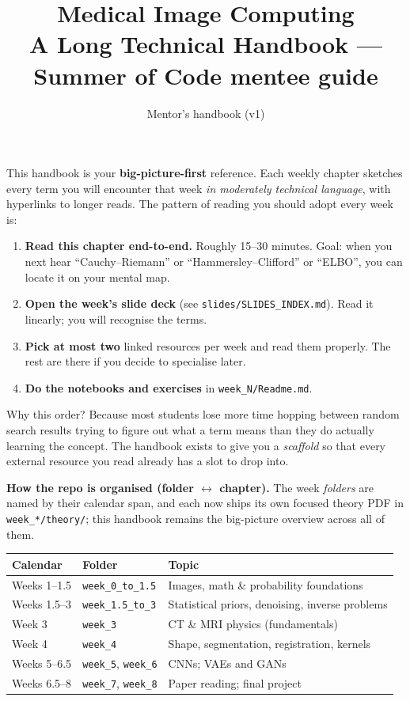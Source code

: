 \documentclass[11pt,a4paper]{article}
\title{\sffamily\bfseries Medical Image Computing\\[3pt]
       \large A Long Technical Handbook --- Summer of Code mentee guide}
\author{\sffamily Mentor's handbook (v1)}
\date{}
\begin{document}
\maketitle

\begin{howtoread}
This handbook is your \textbf{big-picture-first} reference. Each
weekly chapter sketches every term you will encounter that week
\emph{in moderately technical language}, with hyperlinks to longer
reads. The pattern of reading you should adopt every week is:

\begin{enumerate}[nosep, leftmargin=*]
  \item \textbf{Read this chapter end-to-end.} Roughly 15--30 minutes.
        Goal: when you next hear ``Cauchy--Riemann'' or ``Hammersley--Clifford''
        or ``ELBO'', you can locate it on your mental map.
  \item \textbf{Open the week's slide deck} (see
        \texttt{slides/SLIDES\_INDEX.md}). Read it linearly; you will
        recognise the terms.
  \item \textbf{Pick at most two} linked resources per week and read
        them properly. The rest are there if you decide to specialise
        later.
  \item \textbf{Do the notebooks and exercises} in
        \texttt{week\_N/Readme.md}.
\end{enumerate}

Why this order? Because most students lose more time hopping between
random search results trying to figure out what a term means than they
do actually learning the concept. The handbook exists to give you a
\emph{scaffold} so that every external resource you read already has a
slot to drop into.
\end{howtoread}

\bigskip
\noindent\textsf{\bfseries How the repo is organised (folder $\leftrightarrow$ chapter).}
The week \emph{folders} are named by their calendar span, and each now ships its
own focused theory PDF in \texttt{week\_*/theory/}; this handbook remains the
big-picture overview across all of them.

\begin{center}
\begin{tabular}{@{}lll@{}}
\hline
Calendar & Folder & Topic \\
\hline
Weeks 1--1.5 & \texttt{week\_0\_to\_1.5} & Images, math \& probability foundations \\
Weeks 1.5--3 & \texttt{week\_1.5\_to\_3} & Statistical priors, denoising, inverse problems \\
Week 3       & \texttt{week\_3}          & CT \& MRI physics (fundamentals) \\
Week 4       & \texttt{week\_4}          & Shape, segmentation, registration, kernels \\
Weeks 5--6.5 & \texttt{week\_5}, \texttt{week\_6} & CNNs; VAEs and GANs \\
Weeks 6.5--8 & \texttt{week\_7}, \texttt{week\_8} & Paper reading; final project \\
\hline
\end{tabular}
\end{center}
\end{document}
